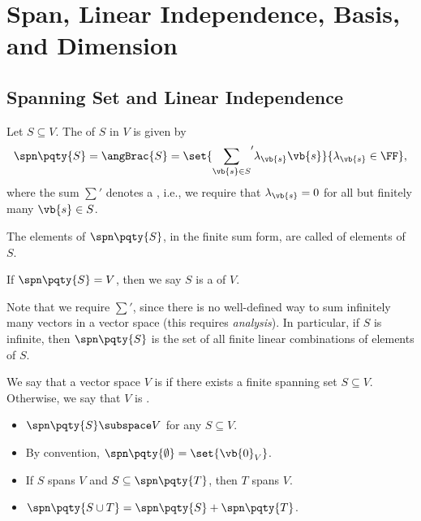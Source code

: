 \section{Span, Linear Independence, Basis, and Dimension}

\subsection{Spanning Set and Linear Independence}

\begin{definition}
    Let \(S \subseteq V\). The  of \(S\) in \(V\) is given by
    \[
        \spn \pqty{S} = \angBrac{S} = \set{{\sum_{\vb{s} \in S}}' \lambda_{\vb{s}} \vb{s}}{\lambda_{\vb{s}} \in \FF},
    \]
    where the sum \({\sum}'\) denotes a , i.e., we require that \(\lambda_{\vb{s}} = 0\) for all but finitely many \(\vb{s} \in S\).
    
    The elements of \(\spn\pqty{S}\), in the finite sum form, are called  of elements of \(S\).

    If \(\spn\pqty{S} = V\), then we say \(S\) is a  of \(V\).
\end{definition}

\begin{remark}
    Note that we require \({\sum}'\), since there is no well-defined way to sum infinitely many vectors in a vector space (this requires \emph{analysis}). In particular, if \(S\) is infinite, then \(\spn\pqty{S}\) is the set of all finite linear combinations of elements of \(S\).
\end{remark}

\begin{definition}
    We say that a vector space \(V\) is  if there exists a finite spanning set \(S \subseteq V\). Otherwise, we say that \(V\) is .
\end{definition}

\begin{remarks}
    \begin{itemize}
        \item \(\spn\pqty{S} \subspace V\) for any \(S \subseteq V\).
        \item By convention, \(\spn\pqty{\emptyset} = \set{\vb{0}_V}\).
        \item If \(S\) spans \(V\) and \(S \subseteq \spn\pqty{T}\), then \(T\) spans \(V\).
        \item \(\spn\pqty{S \cup T} = \spn\pqty{S} + \spn\pqty{T}\).
    \end{itemize}
\end{remarks}

